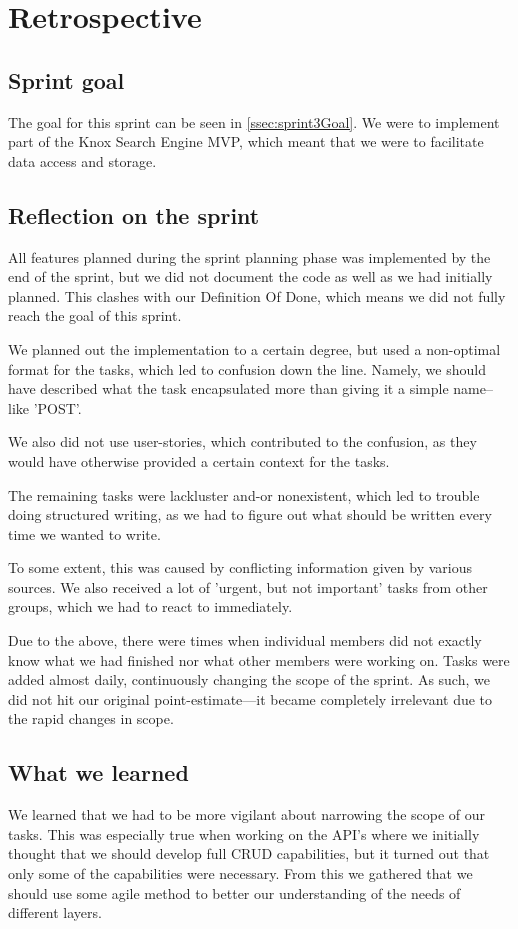 \section{Retrospective}


\subsection{Sprint goal}
The goal for this sprint can be seen in \ref{ssec:sprint3Goal}. We were to implement part of the Knox Search Engine MVP, which meant that we were to facilitate data access and storage.


\subsection{Reflection on the sprint}
All features planned during the sprint planning phase was implemented by the end of the sprint, but we did not document the code as well as we had initially planned. This clashes with our Definition Of Done, which means we did not fully reach the goal of this sprint. 

We planned out the implementation to a certain degree, but used a non-optimal format for the tasks, which led to confusion down the line. Namely, we should have described what the task encapsulated more than giving it a simple name--like 'POST'. 

We also did not use user-stories, which contributed to the confusion, as they would have otherwise provided a certain context for the tasks.

The remaining tasks were lackluster and-or nonexistent, which led to trouble doing structured writing, as we had to figure out what should be written every time we wanted to write.
    
To some extent, this was caused by conflicting information given by various sources. We also received a lot of 'urgent, but not important' tasks from other groups, which we had to react to immediately.
    
Due to the above, there were times when individual members did not exactly know what we had finished nor what other members were working on. Tasks were added almost daily, continuously changing the scope of the sprint.
As such, we did not hit our original point-estimate---it became completely irrelevant due to the rapid changes in scope.

\subsection{What we learned}
We learned that we had to be more vigilant about narrowing the scope of our tasks. This was especially true when working on the API's where we initially thought that we should develop full CRUD capabilities, but it turned out that only some of the capabilities were necessary. From this we gathered that we should use some agile method to better our understanding of the needs of different layers.


